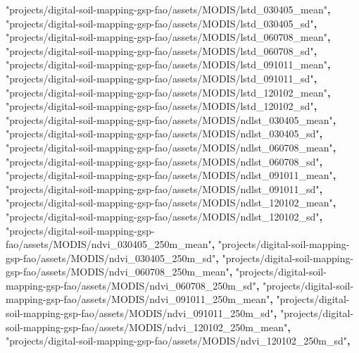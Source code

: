 \documentclass[
  10pt,
  b5paper,
  oneside]{book}
\newenvironment{Shaded}{\begin{snugshade}}{\end{snugshade}}
\newcommand{\OperatorTok}[1]{\textcolor[rgb]{0.81,0.36,0.00}{\textbf{#1}}}
\newcommand{\StringTok}[1]{\textcolor[rgb]{0.31,0.60,0.02}{#1}}
\begin{document}
\begin{Shaded}
\begin{Highlighting}[]
\StringTok{"projects/digital{-}soil{-}mapping{-}gsp{-}fao/assets/MODIS/lstd\_030405\_mean"}\OperatorTok{,}
\StringTok{"projects/digital{-}soil{-}mapping{-}gsp{-}fao/assets/MODIS/lstd\_030405\_sd"}\OperatorTok{,}
\StringTok{"projects/digital{-}soil{-}mapping{-}gsp{-}fao/assets/MODIS/lstd\_060708\_mean"}\OperatorTok{,}
\StringTok{"projects/digital{-}soil{-}mapping{-}gsp{-}fao/assets/MODIS/lstd\_060708\_sd"}\OperatorTok{,}
\StringTok{"projects/digital{-}soil{-}mapping{-}gsp{-}fao/assets/MODIS/lstd\_091011\_mean"}\OperatorTok{,}
\StringTok{"projects/digital{-}soil{-}mapping{-}gsp{-}fao/assets/MODIS/lstd\_091011\_sd"}\OperatorTok{,}
\StringTok{"projects/digital{-}soil{-}mapping{-}gsp{-}fao/assets/MODIS/lstd\_120102\_mean"}\OperatorTok{,}
\StringTok{"projects/digital{-}soil{-}mapping{-}gsp{-}fao/assets/MODIS/lstd\_120102\_sd"}\OperatorTok{,}
\StringTok{"projects/digital{-}soil{-}mapping{-}gsp{-}fao/assets/MODIS/ndlst\_030405\_mean"}\OperatorTok{,}
\StringTok{"projects/digital{-}soil{-}mapping{-}gsp{-}fao/assets/MODIS/ndlst\_030405\_sd"}\OperatorTok{,}
\StringTok{"projects/digital{-}soil{-}mapping{-}gsp{-}fao/assets/MODIS/ndlst\_060708\_mean"}\OperatorTok{,}
\StringTok{"projects/digital{-}soil{-}mapping{-}gsp{-}fao/assets/MODIS/ndlst\_060708\_sd"}\OperatorTok{,}
\StringTok{"projects/digital{-}soil{-}mapping{-}gsp{-}fao/assets/MODIS/ndlst\_091011\_mean"}\OperatorTok{,}
\StringTok{"projects/digital{-}soil{-}mapping{-}gsp{-}fao/assets/MODIS/ndlst\_091011\_sd"}\OperatorTok{,}
\StringTok{"projects/digital{-}soil{-}mapping{-}gsp{-}fao/assets/MODIS/ndlst\_120102\_mean"}\OperatorTok{,}
\StringTok{"projects/digital{-}soil{-}mapping{-}gsp{-}fao/assets/MODIS/ndlst\_120102\_sd"}\OperatorTok{,}
\StringTok{"projects/digital{-}soil{-}mapping{-}gsp{-}fao/assets/MODIS/ndvi\_030405\_250m\_mean"}\OperatorTok{,}
\StringTok{"projects/digital{-}soil{-}mapping{-}gsp{-}fao/assets/MODIS/ndvi\_030405\_250m\_sd"}\OperatorTok{,}
\StringTok{"projects/digital{-}soil{-}mapping{-}gsp{-}fao/assets/MODIS/ndvi\_060708\_250m\_mean"}\OperatorTok{,}
\StringTok{"projects/digital{-}soil{-}mapping{-}gsp{-}fao/assets/MODIS/ndvi\_060708\_250m\_sd"}\OperatorTok{,}
\StringTok{"projects/digital{-}soil{-}mapping{-}gsp{-}fao/assets/MODIS/ndvi\_091011\_250m\_mean"}\OperatorTok{,}
\StringTok{"projects/digital{-}soil{-}mapping{-}gsp{-}fao/assets/MODIS/ndvi\_091011\_250m\_sd"}\OperatorTok{,}
\StringTok{"projects/digital{-}soil{-}mapping{-}gsp{-}fao/assets/MODIS/ndvi\_120102\_250m\_mean"}\OperatorTok{,}
\StringTok{"projects/digital{-}soil{-}mapping{-}gsp{-}fao/assets/MODIS/ndvi\_120102\_250m\_sd"}\OperatorTok{,}

\end{Highlighting}
\end{Shaded}
\end{document}
